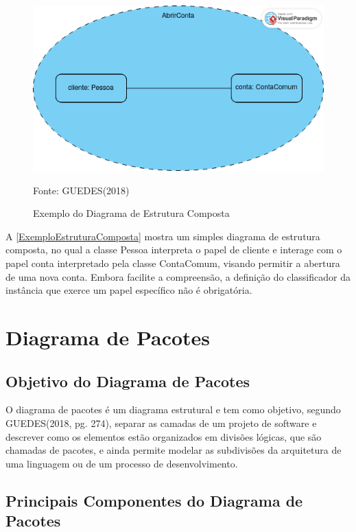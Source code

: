 \documentclass[12pt,openright,oneside,a4paper,
	chapter=TITLE,
	section=TITLE,
	english,brazil]{abntex2}
\begin{document}
\begin{figure}[!htp]
	\caption{Exemplo do Diagrama de Estrutura Composta}
	\centering
	\includegraphics[scale=0.5]{img/Exemplo Diagrama de Estrutura Composta.png}
	\\

	\label{ExemploEstruturaComposta}
	\footnotesize\raggedright Fonte: GUEDES(2018)
\end{figure}

A \autoref{ExemploEstruturaComposta} mostra um simples diagrama de estrutura composta, no qual a classe Pessoa interpreta o papel de cliente e interage com o papel conta interpretado pela classe ContaComum, visando permitir a abertura de uma nova conta. Embora facilite a compreensão, a definição do classificador da instância que exerce um papel específico não é obrigatória. 

\chapter{Diagrama de Pacotes}

\section{Objetivo do Diagrama de Pacotes}

O diagrama de pacotes é um diagrama estrutural e tem como objetivo, segundo GUEDES(2018, pg. 274), separar as camadas de um projeto de software e descrever como os elementos estão organizados em divisões lógicas, que são chamadas de pacotes, e ainda permite modelar as subdivisões da arquitetura de uma linguagem ou de um processo de desenvolvimento.

\section{Principais Componentes do Diagrama de Pacotes}
\end{document}
